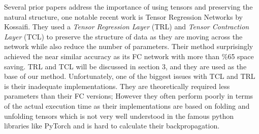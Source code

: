 \documentclass[runningheads]{llncs}
\begin{document}
Several prior papers address the importance of using tensors and preserving the natural structure, one notable recent work is Tensor Regression Networks \cite{kossaifi2020tensor} by Kossaifi. They used a \textit{Tensor Regression Layer} (TRL) and \textit{Tensor Contraction Layer} (TCL) to preserve the structure of data as they are moving across the network while also reduce the number of parameters. Their method surprisingly achieved the near similar accuracy as its FC network with more than \%65 space saving. TRL and TCL will be discussed in section 3, and they are used as the base of our method. Unfortunately, one of the biggest issues with TCL and TRL is their inadequate implementations. They are theoretically required less parameters than their FC versions; However they often perform poorly in terms of the actual execution time as their implementations are based on folding and unfolding tensors which is not very well understood in the famous python libraries like PyTorch and is hard to calculate their backpropagation.  



%

%

%
\end{document}
